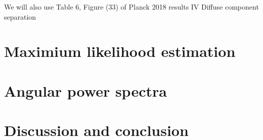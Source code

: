 \documentclass[twocolumn]{../../common/aa}
\begin{document}



We will also use Table 6, Figure (33)
of Planck 2018 results IV Diffuse component separation


\section{Maximium likelihood estimation}


\section{Angular power spectra}

\section{Discussion and conclusion}
\label{sec:conclusion}






%




\end{document}
